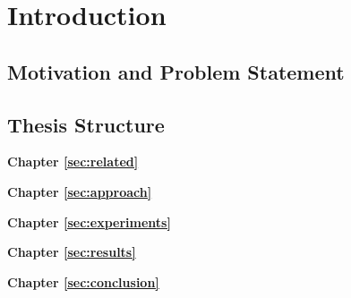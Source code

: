 %
\chapter{Introduction}
\label{sec:intro}

\Blindtext[2][2]

\section{Motivation and Problem Statement}
\label{sec:intro:motivation}

\Blindtext[3][1] \citep{vaswani-nips17}

\section{Thesis Structure}
\label{sec:intro:structure}

\textbf{Chapter \ref{sec:related}} \\[0.2em]
\blindtext

\textbf{Chapter \ref{sec:approach}} \\[0.2em]
\blindtext

\textbf{Chapter \ref{sec:experiments}} \\[0.2em]
\blindtext

\textbf{Chapter \ref{sec:results}} \\[0.2em]
\blindtext

\textbf{Chapter \ref{sec:conclusion}} \\[0.2em]
\blindtext
